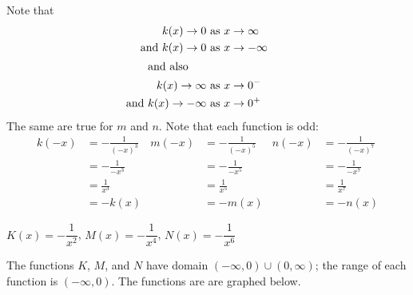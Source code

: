 \begin{doyouunderstand}
\begin{problem}
\begin{subproblem}
\begin{shortsolution}
			Note that
			\begin{align*}
				k(x)\rightarrow 0                                & \text{ as } x\rightarrow\infty  \\  
				\mathllap{\text{and }}    k(x)\rightarrow 0      & \text{ as } x\rightarrow-\infty \\ 
				\intertext{and also}
				k(x)\rightarrow \infty                           & \text{ as } x\rightarrow 0^-    \\    
				\mathllap{\text{and }}   k(x)\rightarrow -\infty & \text{ as } x\rightarrow 0^+    
			\end{align*}
			The same are true for $m$ and $n$. Note that each function is odd:
			\begin{align*}
				k(-x) & =-\frac{1}{(-x)^3} & m(-x) & =-\frac{1}{(-x)^5} & n(-x) & =-\frac{1}{(-x)^7} \\ 
				      & =-\frac{1}{-x^3}   &       & =-\frac{1}{-x^5}   &       & =-\frac{1}{-x^7}   \\   
				      & =\frac{1}{x^3}     &       & =\frac{1}{x^5}     &       & =\frac{1}{x^7}     \\   
				      & =-k(x)             &       & =-m(x)             &       & =-n(x)             
			\end{align*}
		\end{shortsolution}
	\end{subproblem}
	\begin{subproblem}
		$ K(x)=-\dfrac{1}{x^2}$, $ M(x)=-\dfrac{1}{x^4}$, $ N(x)=-\dfrac{1}{x^6}$
		\begin{shortsolution}
			The functions $K$, $M$, and $N$ have domain $(-\infty,0)\cup (0,\infty)$; the 
			range of each function is $(-\infty,0)$. The functions are 
			are graphed below.
						
						

\end{shortsolution}
\end{subproblem}
\end{problem}
\end{doyouunderstand}

